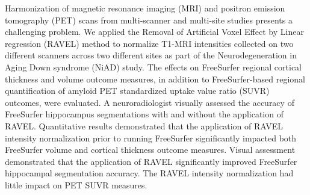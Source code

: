 Harmonization of magnetic resonance imaging (MRI) and positron emission tomography (PET) scans from multi-scanner and multi-site studies presents a challenging problem. We applied the Removal of Artificial Voxel Effect by Linear regression (RAVEL) method to normalize T1-MRI intensities collected on two different scanners across two different sites as part of the Neurodegeneration in Aging Down syndrome (NiAD) study. The effects on FreeSurfer regional cortical thickness and volume outcome measures, in addition to FreeSurfer-based regional quantification of amyloid PET standardized uptake value ratio (SUVR) outcomes, were evaluated. A neuroradiologist visually assessed the accuracy of FreeSurfer hippocampus segmentations with and without the application of RAVEL. Quantitative results demonstrated that the application of RAVEL intensity normalization prior to running FreeSurfer significantly impacted both FreeSurfer volume and cortical thickness outcome measures. Visual assessment demonstrated that the application of RAVEL significantly improved FreeSurfer hippocampal segmentation accuracy. The RAVEL intensity normalization had little impact on PET SUVR measures.



